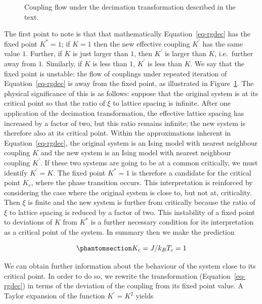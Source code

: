 \documentclass[
  letterpaper,
  enabledeprecatedfontcommands]{report}
\begin{document}
\begin{tcolorbox}
\begin{figure}[H]
{}

\caption{\label{fig-flow1}Coupling flow under the decimation
transformation described in the text.}

\end{figure}%

The first point to note is that that mathematically
Equation~\ref{eq-rgdec} has the fixed point \(K^*= 1\); if \(K= 1\) then
the new effective coupling \(K^\prime\) has the same value \(1\).
Further, if \(K\) is just larger than \(1\), then \(K^\prime\) is larger
than \(K\), i.e.~further away from \(1\). Similarly, if \(K\) is less
than \(1\), \(K^\prime\) is less than \(K\). We say that the fixed point
is unstable: the flow of couplings under repeated iteration of
Equation~\ref{eq-rgdec} is away from the fixed point, as illustrated in
Figure~\ref{fig-flow1}. The physical significance of this is as follows:
suppose that the original system is at its critical point so that the
ratio of \(\xi\) to lattice spacing is infinite. After one application
of the decimation transformation, the effective lattice spacing has
increased by a factor of two, but this ratio remains infinite; the new
system is therefore also at its critical point. Within the
approximations inherent in Equation~\ref{eq-rgdec}, the original system
is an Ising model with nearest neighbour coupling \(K\) and the new
system is an Ising model with nearest neighbour coupling \(K^\prime\).
If these two systems are going to be at a common critically, we must
identify \(K^\prime=
K\). The fixed point \(K^*= 1\) is therefore a candidate for the
critical point \(K_c\), where the phase transition occurs. This
interpretation is reinforced by considering the case where the original
system is close to, but not at, criticality. Then \(\xi\) is finite and
the new system is further from critically because the ratio of \(\xi\)
to lattice spacing is reduced by a factor of two. This instability of a
fixed point to deviations of \(K\) from \(K^*\) is a further necessary
condition for its interpretation as a critical point of the system. In
summary then we make the prediction

\begin{equation}\phantomsection\label{eq-Kc}{
K_c=J/k_BT_c=1
}\end{equation}

We can obtain further information about the behaviour of the system
close to its critical point. In order to do so, we rewrite the
transformation (Equation~\ref{eq-rgdec}) in terms of the deviation of
the coupling from its fixed point value. A Taylor expansion of the
function \(K^\prime=K^2\) yields


\end{tcolorbox}
\end{document}
